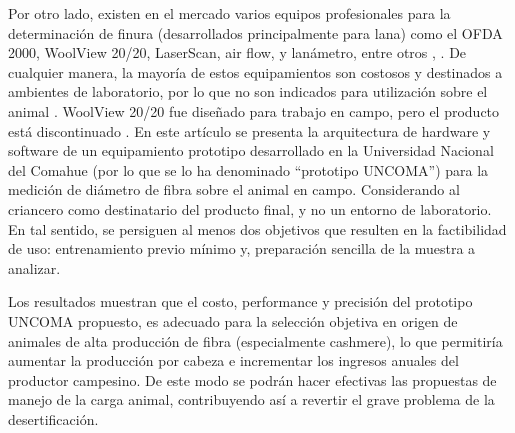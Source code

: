 \documentclass[runningheads,a4paper]{llncs}
\begin{document}
Por otro lado, existen en el mercado varios equipos profesionales para la determinación de finura (desarrollados principalmente para lana) como el OFDA 2000, WoolView 20/20, LaserScan, air flow, y lanámetro, entre otros \cite{ofda}, \cite{laser}. De cualquier manera, la mayoría de estos equipamientos son costosos y destinados a ambientes de laboratorio, por lo que no son indicados para utilización sobre el animal \cite{baxter}. WoolView 20/20 fue diseñado para trabajo en campo, pero el producto está discontinuado \cite{wv}.
En este artículo se presenta la arquitectura de hardware y software de un equipamiento prototipo desarrollado en la Universidad Nacional del Comahue (por lo que se lo ha denominado ``prototipo UNCOMA'') para la medición de diámetro de fibra sobre el animal en campo. Considerando al criancero como destinatario del 
producto final, y no un entorno de laboratorio. En tal sentido, se persiguen al menos dos objetivos que 
resulten en la factibilidad de uso: entrenamiento previo mínimo y, preparación sencilla de la muestra a 
analizar.  
 
Los resultados muestran que el costo, performance y precisión del prototipo UNCOMA propuesto, es adecuado para la selección objetiva en origen de animales de alta producción de fibra (especialmente cashmere), lo que permitiría aumentar la producción por cabeza e incrementar los ingresos anuales del productor campesino. De este modo se podrán hacer efectivas las propuestas de manejo de la carga animal, contribuyendo así a revertir el grave problema de la desertificación.

%
\end{document}
